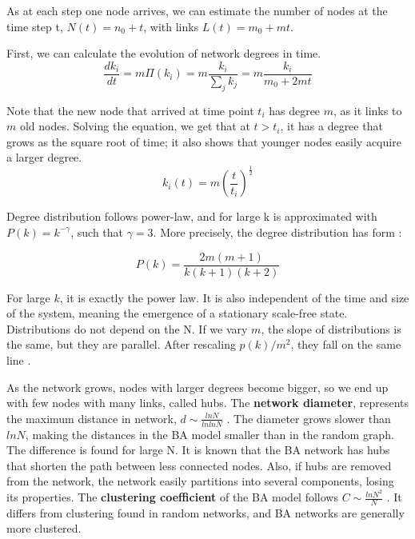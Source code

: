 As at each step one node arrives, we can estimate the number of nodes at the time step t, $N(t) = n_0+t$, with links $L(t) =m_0+ mt$. 

First, we can calculate the evolution of network degrees in time.
\begin{equation}
\frac{dk_i}{dt} = m\Pi(k_i) = m\frac{k_i}{\sum_jk_j} = m\frac{k_i}{m_0 + 2mt}
\end{equation}

Note that the new node that arrived at time point $t_i$ has degree $m$, as it links to $m$ old nodes. Solving the equation, we get that at $t>t_i$, it has a degree that grows as the square root of time; it also shows that younger nodes easily acquire a larger degree. 
\begin{equation}
k_i(t) = m \left(\frac{t}{t_i}\right)^{\frac{1}{2}}
\end{equation}


Degree distribution follows power-law, and for large k is approximated with $P(k) = k^{-\gamma}$, such that $\gamma=3$. More precisely, the degree distribution has form \cite{krapivsky2010kinetic}:

\begin{equation}
P(k) = \frac{2m(m+1)}{k(k+1)(k+2)}
\end{equation}

For large $k$, it is exactly the power law. It is also independent of the time and size of the system, meaning the emergence of a stationary scale-free state. Distributions do not depend on the N. If we vary $m$, the slope of distributions is the same, but they are parallel. After rescaling $p(k)/m^2$, they fall on the same line \cite{barabasi2016network}.


As the network grows, nodes with larger degrees become bigger, so we end up with few nodes with many links, called hubs. The \textbf{network diameter}, represents the maximum distance in network, $d \sim \frac{lnN}{lnlnN}$ \cite{bollobas2003mathematical}. The diameter grows slower than $lnN$, making the distances in the BA model smaller than in the random graph. The difference is found for large N. It is known that the BA network has hubs that shorten the path between less connected nodes. Also, if hubs are removed from the network, the network easily partitions into several components, losing its properties. The \textbf{clustering coefficient} of the BA model follows $C \sim \frac{ln N^2}{N}$ \cite{bollobas2003mathematical}. It differs from clustering found in random networks, and BA networks are generally more clustered. 

